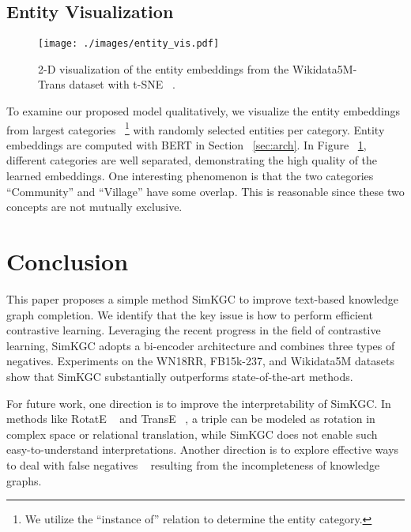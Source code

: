 \documentclass[11pt]{article}
\begin{document}
\subsection{Entity Visualization}

\begin{figure}[ht]
\begin{center}
 \texttt{[image: ./images/entity\_vis.pdf]}
 \caption{2-D visualization of the entity embeddings
 from the Wikidata5M-Trans dataset with t-SNE ~\citep{Maaten2008VisualizingDU}.}
 \label{fig:entity_vis}
\end{center}
\end{figure}

To examine our proposed model qualitatively,
we visualize the entity embeddings from  largest categories
~\footnote{We utilize the ``instance of'' relation to determine the entity category.}
with  randomly selected entities per category.
Entity embeddings are computed with BERT in Section ~\ref{sec:arch}.
In Figure ~\ref{fig:entity_vis},
different categories are well separated,
demonstrating the high quality of the learned embeddings.
One interesting phenomenon is that
the two categories ``Community'' and ``Village'' have some overlap.
This is reasonable since these two concepts are not mutually exclusive.

\section{Conclusion}
This paper proposes a simple method SimKGC
to improve text-based knowledge graph completion.
We identify that the key issue is how to perform efficient contrastive learning.
Leveraging the recent progress in the field of contrastive learning,
SimKGC adopts a bi-encoder architecture
and combines three types of negatives.
Experiments on the WN18RR, FB15k-237, and Wikidata5M datasets
show that SimKGC substantially outperforms state-of-the-art methods.

For future work,
one direction is to improve the interpretability of SimKGC.
In methods like RotatE ~\citep{sun2018rotate} and TransE ~\citep{bordes2013translating},
a triple can be modeled as rotation in complex space or relational translation,
while SimKGC does not enable such easy-to-understand interpretations.
Another direction is to explore effective ways to deal with false negatives ~\citep{Huynh2020BoostingCS}
resulting from the incompleteness of knowledge graphs.
\end{document}
